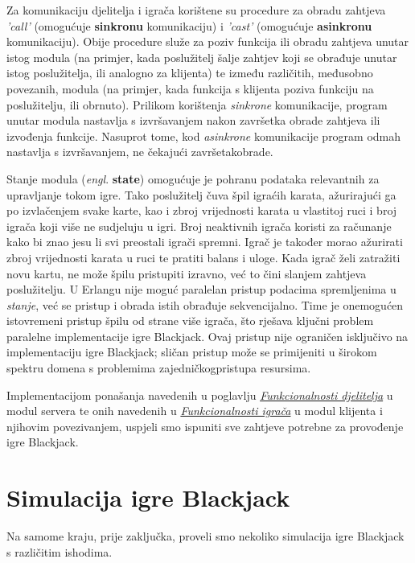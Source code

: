 \documentclass{IEEEcsmag}
\begin{document}
Za komunikaciju djelitelja i igrača korištene su procedure za obradu zahtjeva \textit{'call'} (omogućuje \textbf{sinkronu} komunikaciju) i \textit{'cast'} (omogućuje \textbf{asinkronu} komunikaciju). Obije procedure služe za poziv funkcija ili obradu zahtjeva unutar istog modula (na primjer, kada poslužitelj šalje zahtjev koji se obrađuje unutar istog poslužitelja, ili analogno za klijenta) te između različitih, međusobno povezanih, modula (na primjer, kada funkcija s klijenta poziva funkciju na poslužitelju, ili obrnuto). Prilikom korištenja \textit{sinkrone} komunikacije, program unutar modula nastavlja s izvršavanjem nakon završetka obrade zahtjeva ili izvođenja funkcije. Nasuprot tome, kod \textit{asinkrone} komunikacije program odmah nastavlja s izvršavanjem, ne čekajući završetak\break obrade.

Stanje modula (\textit{engl}. \textbf{state}) omogućuje je pohranu podataka relevantnih za upravljanje tokom igre. Tako poslužitelj čuva špil igraćih karata, ažurirajući ga po izvlačenjem svake karte, kao i zbroj vrijednosti karata u vlastitoj ruci i broj igrača koji više ne sudjeluju u igri. Broj neaktivnih igrača koristi za računanje kako bi znao jesu li svi preostali igrači spremni. Igrač je također morao ažurirati zbroj vrijednosti karata u ruci te pratiti balans i uloge. Kada igrač želi zatražiti novu kartu, ne može špilu pristupiti izravno, već to čini slanjem zahtjeva poslužitelju. U Erlangu nije moguć paralelan pristup podacima spremljenima u \textit{stanje}, već se pristup i obrada istih obrađuje sekvencijalno. Time je onemogućen istovremeni pristup špilu od strane više igrača, što rješava ključni problem paralelne implementacije igre Blackjack. Ovaj pristup nije ograničen isključivo na implementaciju igre Blackjack; sličan pristup može se primijeniti u širokom spektru domena s problemima zajedničkog\break pristupa resursima. 

Implementacijom ponašanja navedenih u poglavlju \hyperref[sec:djelitelj]{\textit{Funkcionalnosti djelitelja}} u modul servera te onih navedenih u \hyperref[sec:igrac]{\textit{Funkcionalnosti igrača}} u modul klijenta i njihovim povezivanjem, uspjeli smo ispuniti sve zahtjeve potrebne za provođenje igre Blackjack.


\section{Simulacija igre Blackjack}
\vspace{5mm}
Na samome kraju, prije zaključka, proveli smo nekoliko simulacija igre Blackjack s različitim ishodima.
\end{document}
